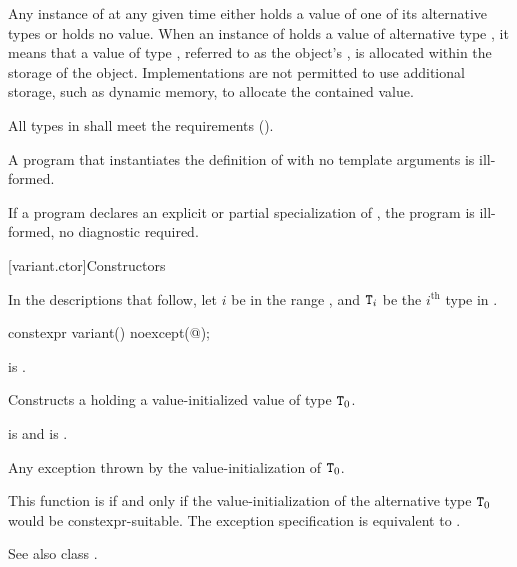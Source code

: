\pnum
Any instance of  at any given time either holds a value
of one of its alternative types or holds no value.
When an instance of  holds a value of alternative type ,
it means that a value of type , referred to as the 
object's , is allocated within the storage of the
 object.
Implementations are not permitted to use additional storage, such as dynamic
memory, to allocate the contained value.

\pnum
All types in  shall meet
the  requirements ().

\pnum
A program that instantiates the definition of  with
no template arguments is ill-formed.

\pnum
If a program declares an explicit or partial specialization of ,
the program is ill-formed, no diagnostic required.

[variant.ctor]{Constructors}

\pnum
In the descriptions that follow, let $i$ be in the range ,
and $\texttt{\protect T}_i$ be the $i^\text{th}$ type in .

%
\begin{itemdecl}
constexpr variant() noexcept(@\seebelow@);
\end{itemdecl}

\begin{itemdescr}
\pnum
\constraints
{} is .

\pnum
\effects
Constructs a  holding a value-initialized value of type $\texttt{\protect T}_0$.

\pnum
\ensures
{} is  and  is .

\pnum
\throws
Any exception thrown by the value-initialization of $\texttt{\protect T}_0$.

\pnum
\remarks
This function is  if and only if the
value-initialization of the alternative type $\texttt{\protect T}_0$
would be constexpr-suitable.
The exception specification is equivalent to
.
\begin{note}
See also class .
\end{note}
\end{itemdescr}

